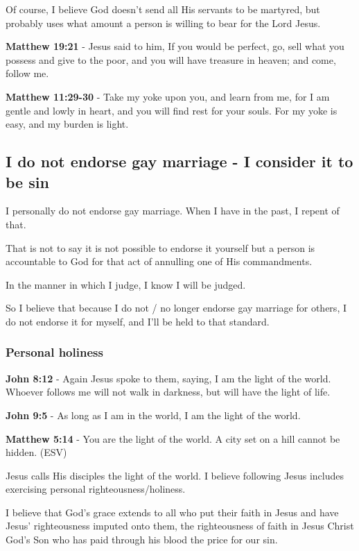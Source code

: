 \documentclass[11pt]{article}
\begin{document}
Of course, I believe God doesn't send all His servants to be martyred, but probably uses what amount a person is willing to bear for the Lord Jesus.

\textbf{Matthew 19:21} - Jesus said to him, If you would be perfect, go, sell what you possess and give to the poor, and you will have treasure in heaven; and come, follow me.

\textbf{Matthew 11:29-30} - Take my yoke upon you, and learn from me, for I am gentle and lowly in heart, and you will find rest for your souls. For my yoke is easy, and my burden is light.

\subsection{I do not endorse gay marriage - I consider it to be sin}
\label{sec:org5d0b276}
I personally do not endorse gay marriage. When I have in the past, I repent of that.

That is not to say it is not possible to
endorse it yourself but a person is
accountable to God for that act of annulling
one of His commandments.

In the manner in which I judge, I know I will
be judged.

So I believe that because I do not / no longer
endorse gay marriage for others, I do not
endorse it for myself, and I'll be held to
that standard.

\subsubsection{Personal holiness}
\label{sec:orga7c5de9}
\textbf{John 8:12} - Again Jesus spoke to them, saying, I am the light of the world. Whoever follows me will not walk in darkness, but will have the light of life.

\textbf{John 9:5} - As long as I am in the world, I am the light of the world.

\textbf{Matthew 5:14} - You are the light of the world. A city set on a hill cannot be hidden. (ESV)

Jesus calls His disciples the light of the world.
I believe following Jesus includes exercising personal righteousness/holiness.

I believe that God's grace extends to all who
put their faith in Jesus and have Jesus'
righteousness imputed onto them, the
righteousness of faith in Jesus Christ God's
Son who has paid through his blood the price
for our sin.
\end{document}
